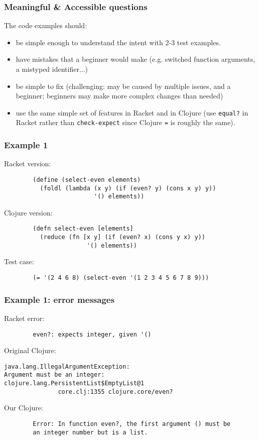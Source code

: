 \documentclass{beamer}
\begin{document}
\begin{frame}
	\frametitle{Meaningful \& Accessible questions}
The code examples should: 
	\begin{itemize}
		\item be simple enough to understand the intent with 2-3 test examples. 
		\item have mistakes that a beginner would make (e.g. switched function arguments, a mistyped identifier...) 
		\item be simple to fix (challenging: may  be caused by multiple issues, and a beginner; beginners may make more complex changes than needed)
		\item use the same simple set of features in Racket and in Clojure (use \texttt{equal?} in Racket rather than \texttt{check-expect} since Clojure {\tt =} is roughly the same). 
	\end{itemize}
\end{frame}

\begin{frame}[fragile]
\frametitle{Example 1}
Racket version:
\begin{verbatim}
		(define (select-even elements) 
		  (foldl (lambda (x y) (if (even? y) (cons x y) y)) 
                         '() elements))
\end{verbatim}
Clojure version:  
\begin{verbatim}
		(defn select-even [elements] 
		  (reduce (fn [x y] (if (even? x) (cons y x) y))  
                       '() elements))
\end{verbatim}
Test case:
\begin{verbatim}
		(= '(2 4 6 8) (select-even '(1 2 3 4 5 6 7 8 9)))
\end{verbatim}
\end{frame}


\begin{frame}[fragile]
\frametitle{Example 1: error messages}
Racket error:
\begin{verbatim}
		even?: expects integer, given '()
\end{verbatim}

Original Clojure:
\begin{verbatim}
java.lang.IllegalArgumentException: 
Argument must be an integer: 
clojure.lang.PersistentList$EmptyList@1
               core.clj:1355 clojure.core/even?	
\end{verbatim}

Our Clojure: 
\begin{verbatim}
		Error: In function even?, the first argument () must be
		an integer number but is a list.
\end{verbatim}
\end{frame}
\end{document}
